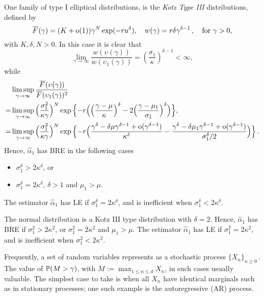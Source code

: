 \begin{Example}
 One family of type I elliptical distributions, is the \emph{Kotz Type III} distributions, defined by
 \[
  \Ftail(\gamma)=(K+\oh(1))\gamma^N\exp(-ru^\delta),\quad w(\gamma)=r\delta \gamma^{\delta-1}\,, \quad \text{for } \gamma>0,
 \]
 with $K,\delta,N>0$.  In this case it is clear that
 \[
  \lim_{\gamma\to \infty}\frac{w(\upsilon(\gamma))}{w(\upsilon_1(\gamma))}=\left(\frac{\sigma_1}{\kappa}\right)^{\delta-1}<\infty,
 \]
 while
  \begin{align*}
  &\limsup_{\gamma\to \infty}\frac{\Ftail(\upsilon(\gamma))}{\Ftail(\upsilon_1(\gamma))^{2}} \\
   =&\limsup_{\gamma\to \infty}\Big(\frac{\sigma_1^2}{\kappa \gamma}\Big)^{N}
    \exp\Big\{ {-}r\Big(\Big(\frac{\gamma-\mu}{\kappa}\Big)^\delta-2\Big(\frac{\gamma-\mu_1}{\sigma_1}\Big)^\delta\Big)\Big\},\\
   =&\limsup_{\gamma\to \infty}\Big(\frac{\sigma_1^2}{\kappa \gamma}\Big)^{N}
    \exp\Big\{ {-}r\Big(\frac{\gamma^\delta-\delta\mu \gamma^{\delta-1}+\oh(\gamma^{\delta-1})}{\kappa^\delta}
    -\frac{\gamma^\delta-\delta\mu_1 \gamma^{\delta-1}+\oh(\gamma^{\delta-1})}{\sigma_1^\delta/2}\Big)\Big\} \,.
 \end{align*}
 Hence, $\hat{\alpha}_1$ has BRE in the following cases
 \begin{itemize}
  \item $\sigma_1^\delta>2\kappa^\delta$, or
  \item $\sigma_1^\delta=2\kappa^\delta$, $\delta>1$ and $\mu_1>\mu$.
 \end{itemize}
 The estimator $\hat{\alpha}_1$ has LE if $\sigma_1^\delta=2\kappa^\delta$, and is inefficient when $\sigma_1^\delta<2\kappa^\delta$.
\end{Example}

\begin{Example} \label{ex:normal}
The normal distribution is a Kotz III type distribution with $\delta=2$.
Hence, $\hat{\alpha}_1$ has BRE if $\sigma_1^2>2\kappa^2$, or $\sigma_1^2=2\kappa^2$ and $\mu_1>\mu$.
The estimator $\hat{\alpha}_1$ has LE if $\sigma_1^2=2\kappa^2$, and is inefficient when $\sigma_1^2<2\kappa^2$.
\end{Example}

Frequently, a set of random variables represents as a stochastic process $\{X_n\}_{n\ge0}\,$. The value of $\operatorname{{\mathbb P}}(M > \gamma)$, with $M := \max_{1 \le n \le d} X_n$, in such cases usually valuable. The simplest case to take is when all $X_n$ have identical marginals such as in stationary processes; one such example is the autoregressive (AR) process.

